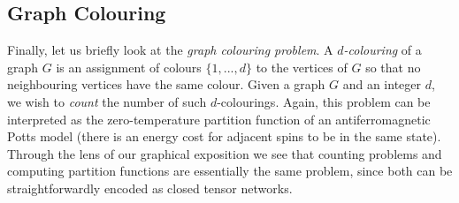





\subsection{Graph Colouring}


Finally, let us briefly look at the \emph{graph colouring problem}. A \emph{$d$-colouring} of a graph $G$ is an assignment of colours $\{1, ..., d\}$ to the vertices of $G$ so that no neighbouring vertices have the same colour. Given a graph $G$ and an integer $d$, we wish to \emph{count} the number of such $d$-colourings. Again, this problem can be interpreted as the zero-temperature
partition function of an antiferromagnetic Potts model (there is an energy cost for adjacent spins to be in the same state).
Through the lens of our graphical exposition we see that counting problems and computing partition functions are essentially the same problem, since both can be straightforwardly encoded as closed tensor networks.

